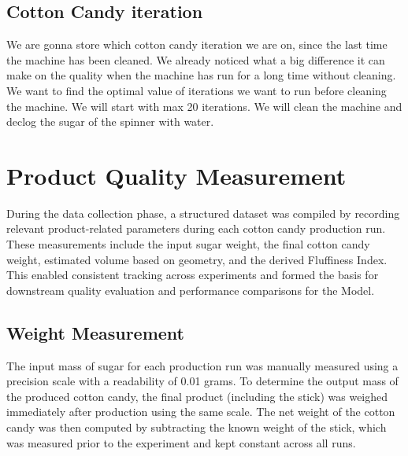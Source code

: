 \subsection{Cotton Candy iteration}
We are gonna store which cotton candy iteration we are on, since the last time the machine has been cleaned. We already noticed what a big difference it can make on the quality when the machine has run for a long time without cleaning. 
We want to find the optimal value of iterations we want to run before cleaning the machine. We will start with max 20 iterations.
We will clean the machine and declog the sugar of the spinner with water.


\section{Product Quality Measurement}

During the data collection phase, a structured dataset was compiled by recording relevant product-related parameters during each cotton candy production run. These measurements include the input sugar weight, the final cotton candy weight, estimated volume based on geometry, and the derived Fluffiness Index. This enabled consistent tracking across experiments and formed the basis for downstream quality evaluation and performance comparisons for the Model.

\subsection{Weight Measurement}


The input mass of sugar for each production run was manually measured using a precision scale with a readability of 0.01 grams. To determine the output mass of the produced cotton candy, the final product (including the stick) was weighed immediately after production using the same scale. The net weight of the cotton candy was then computed by subtracting the known weight of the stick, which was measured prior to the experiment and kept constant across all runs.

